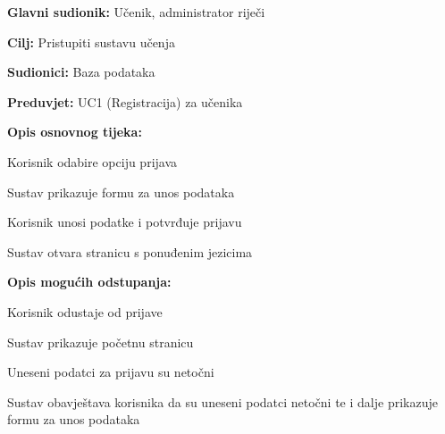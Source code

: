 					
					\noindent {}
					\begin{packed_item}
						
						\item \textbf{Glavni sudionik: }Učenik, administrator riječi
						\item  \textbf{Cilj:} Pristupiti sustavu učenja
						\item  \textbf{Sudionici:} Baza podataka
						\item  \textbf{Preduvjet:} UC1 (Registracija) za učenika
						\item  \textbf{Opis osnovnog tijeka:}
						
						\item[] \begin{packed_enum}
							
							\item Korisnik odabire opciju prijava
							\item Sustav prikazuje formu za unos podataka
							\item Korisnik unosi podatke i potvrđuje prijavu
							\item Sustav otvara stranicu s ponuđenim jezicima
						\end{packed_enum}
						
						\item  \textbf{Opis mogućih odstupanja:}
						
						\item[] \begin{packed_item}
							
							\item[3.a] Korisnik odustaje od prijave
							\item[] \begin{packed_enum}
								
								\item Sustav prikazuje početnu stranicu
								
							\end{packed_enum}
							
							\item[3.b] Uneseni podatci za prijavu su netočni
							\item[] \begin{packed_enum}
								
								\item Sustav obavještava korisnika da su uneseni podatci netočni te i dalje prikazuje formu za unos podataka
								
							\end{packed_enum}
							

\end{packed_item}
\end{packed_item}
